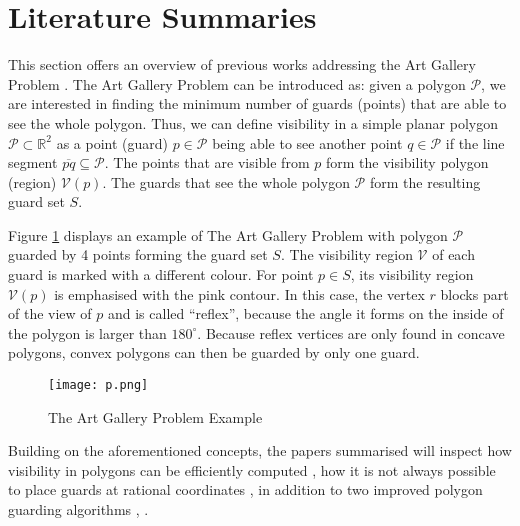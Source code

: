 \section{Literature Summaries}
This section offers an overview of previous works addressing the Art Gallery Problem \cite{o1987art}. The Art Gallery Problem \cite{o1987art} can be introduced as: given a polygon $\mathcal P$, we are interested in finding the minimum number of guards (points) that are able to see the whole polygon. Thus, we can define visibility in a simple planar polygon $\mathcal P \subset \mathbb R^2$ as a point (guard) $p \in \mathcal P$ being able to see another point $q \in \mathcal P$ if the line segment $\overline{pq} \subseteq \mathcal P$. The points that are visible from $p$ form the visibility polygon (region) $\mathcal V(p)$. The guards that see the whole polygon $\mathcal P$ form the resulting guard set $S$.

Figure \ref{fig:art} displays an example of The Art Gallery Problem \cite{o1987art} with polygon $\mathcal P$ guarded by 4 points forming the guard set $S$. The visibility region $\mathcal V$ of each guard is marked with a different colour. For point $p \in S$, its visibility region $\mathcal V(p)$ is emphasised with the pink contour. In this case, the vertex $r$ blocks part of the view of $p$ and is called ``reflex'', because the angle it forms on the inside of the polygon is larger than $180^\circ$. Because reflex vertices are only found in concave polygons, convex polygons can then be guarded by only one guard.

\begin{figure}[h!]
    \centering
    \texttt{[image: p.png]}
    \caption{The Art Gallery Problem \cite{o1987art} Example}
    \label{fig:art}
\end{figure}
Building on the aforementioned concepts, the papers summarised will inspect how visibility in polygons can be efficiently computed \cite{DBLP:journals/corr/BungiuHHHK14}, how it is not always possible to place guards at rational coordinates \cite{abrahamsen2021art}, in addition to two improved polygon guarding algorithms \cite{maleki2022implementation}, \cite{DBLP:journals/corr/abs-2007-06920}.





\newpage

